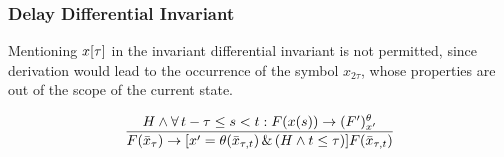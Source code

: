 \documentclass[10pt]{article}
\begin{document}
\begin{figure}
\begin{sequentdeduction}[]
{{{{{{{                                        }
                                    }{
                                    }
                                }{
                                }
                            }{
                            }
                        }{
                        }
                    }{
                    }
                }
                {}
            \end{sequentdeduction}
            \end{figure}
            \normalsize

        \subsubsection{Delay Differential Invariant}
            \label{sec:elay-differential-invariant}

            Mentioning $x[\tau]$ in the invariant differential invariant is not permitted, since derivation would lead to the occurrence of the symbol $x_{2\tau}$, whose properties are out of the scope of the current state.

            \begin{equation}
                \frac{H\wedge\forall\,t-\tau\leq s<t: F(x(s))\rightarrow (F')^{\theta}_{x'}}{F(\bar{x}_{\tau})\rightarrow [x'=\theta(\bar{x}_{\tau,t})\,\&\,(H\wedge t\leq\tau)]F(\bar{x}_{\tau,t})}
            \end{equation}

\end{document}
